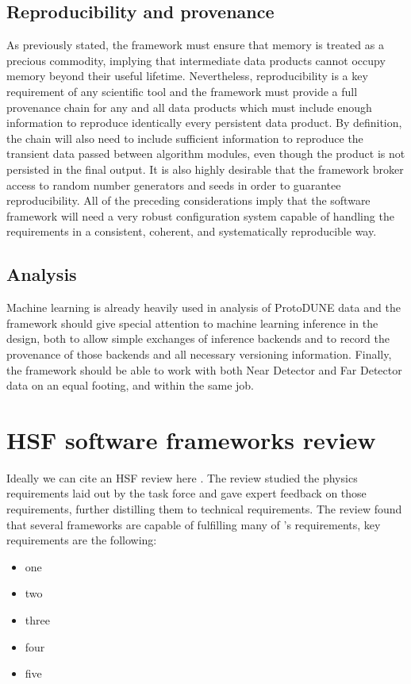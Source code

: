 \documentclass[../main-00.tex]{subfiles}
\begin{document}
\subsection{Reproducibility and provenance}
As previously stated, the framework must ensure that memory is treated as a precious commodity, implying that intermediate data products cannot occupy memory beyond their useful lifetime.  Nevertheless, reproducibility is a key requirement of any scientific tool and the framework must provide a full provenance chain for any and all data products which must include enough information to reproduce identically every persistent data product. By definition, the chain will also need to include sufficient information to reproduce the transient data passed between algorithm modules, even though the product is not persisted in the final output.
It is also highly desirable that the framework broker access to random number generators and seeds in order to guarantee reproducibility.  All of the preceding considerations imply that the software framework will need a very robust configuration system capable of handling the requirements in a consistent, coherent, and systematically reproducible way.

\subsection{Analysis}
Machine learning is already heavily used in analysis of ProtoDUNE data and the framework should give special attention to machine learning inference in the design, both to allow simple exchanges of inference backends and to record the provenance of those backends and all necessary versioning information.  Finally, the framework should be able to work with both Near Detector and Far Detector data on an equal footing, and within the same job.


\section{HSF software frameworks review }

Ideally we can cite an HSF review here \cite{HSF-fwk-review}.  The review studied the physics requirements laid out by the task force and gave expert feedback on those requirements, further distilling them to technical requirements.  The review found that several frameworks are capable of fulfilling many of 's requirements, key requirements are the following:

\begin{itemize}
    \item one
    \item two
    \item three
    \item four
    \item five
\end{itemize}
\end{document}

